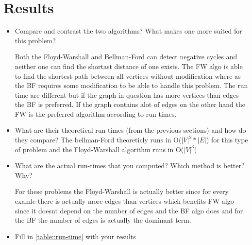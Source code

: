 \documentclass[twocolumn]{article}
\begin{document}
\section{Results}
\begin{itemize}
    \item Compare and contrast the two algorithms? What makes one more suited
    for this problem?
    
    Both the Floyd-Warshall and Bellman-Ford can detect negative cycles and neither one can find the shortast distance of one exists. The FW algo is able to find the shortest path between all vertices without modification where as the BF requires some modification to be able to handle this problem. The run time are different but if the graph in question has more vertices than edges the BF is preferred. If the graph contains alot of edges on the other hand the FW is the preferred algorithm according to run times.
    
    \item What are their theoretical run-times (from the previous sections) and
    how do they compare?
    The bellman-Ford theoreticly runs in O($|V|^{2}*|E|$) for this type of problem and the Floyd-Warshall algorithm runs in O($|V|^{3}$)
    
    \item What are the actual run-times that you computed? Which method is
    better? Why?
    
    For these problems the Floyd-Warshall is actually better since for every examle there is actually more edges than vertices which benefits FW algo since it doesnt depend on the number of edges and the BF algo does and for the BF the number of edges is actually the dominant term.
    
    \item Fill in \cref{table::run-time} with your results
\end{itemize}
\end{document}
